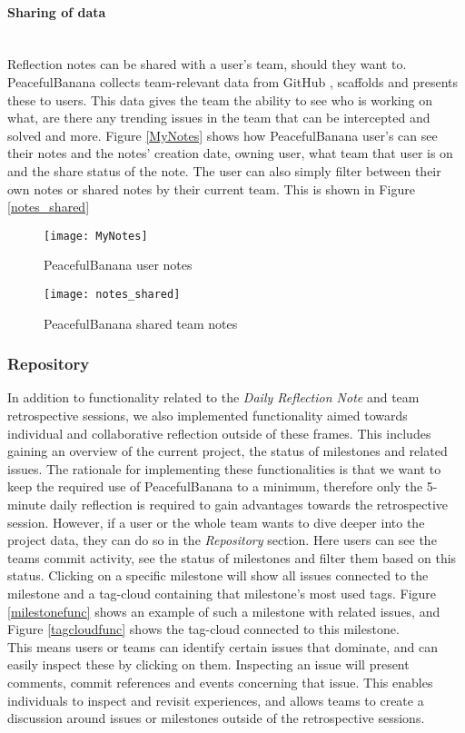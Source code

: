 \paragraph{Sharing of data}\mbox{}\\
Reflection notes can be shared with a user's team, should they want to.  PeacefulBanana collects team-relevant data from GitHub , scaffolds and presents these to users. This data gives the team the ability to see who is working on what, are there any trending issues in the team that can be intercepted and solved and more.  
Figure \ref{MyNotes} shows how PeacefulBanana user's can see their notes and the notes' creation date, owning user, what team that user is on and the share status of the note. The user can also simply filter between their own notes or shared notes by their current team. This is shown in Figure \ref{notes_shared}
\begin{figure}[H]
    \centering
        \texttt{[image: MyNotes]}
    \caption{PeacefulBanana user notes}
    \label{MyNotesFunc}
\end{figure}
\begin{figure}[H]
    \centering
        \texttt{[image: notes\_shared]}
    \caption{PeacefulBanana shared team notes}
    \label{notes_sharedfunc}
\end{figure}

\subsubsection{Repository}
In addition to functionality related to the \emph{Daily Reflection Note} and team retrospective sessions, we also implemented functionality aimed towards individual and collaborative reflection outside of these frames. This includes gaining an overview of the current project, the status of milestones and related issues. The rationale for implementing these functionalities is that we want to keep the required use of PeacefulBanana to a minimum, therefore only the 5-minute daily reflection is required to gain advantages towards the retrospective session. However, if a user or the whole team wants to dive deeper into the project data, they can do so in the \emph{Repository} section. Here users can see the teams commit activity, see the status of milestones and filter them based on this status. Clicking on a specific milestone will show all issues connected to the milestone and a tag-cloud containing that milestone's most used tags. Figure \ref{milestonefunc} shows an example of such a milestone with related issues, and Figure \ref{tagcloudfunc} shows the tag-cloud connected to this milestone. \\
This means users or teams can identify certain issues that dominate, and can easily inspect these by clicking on them. Inspecting an issue will present comments, commit references and events concerning that issue. This enables individuals to inspect and revisit experiences, and allows teams to create a discussion around issues or milestones outside of the retrospective sessions. 

